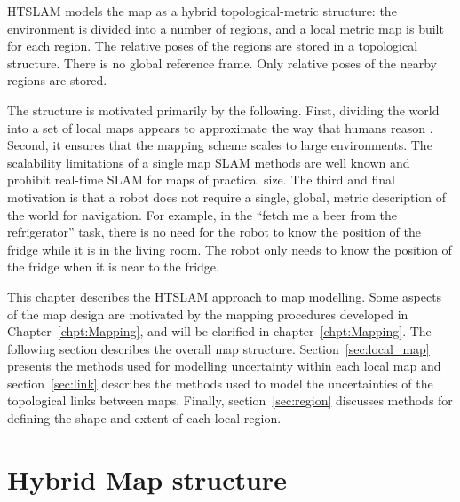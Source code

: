 HTSLAM models the map as a hybrid topological-metric structure: the
environment is divided into a number of regions, and a local metric
map is built for each region. The relative poses of the regions are
stored in a topological structure. There is no global reference
frame. Only relative poses of the nearby regions are stored.


The structure is motivated primarily by the following.  First,
dividing the world into a set of local maps appears to approximate the
way that humans reason \cite{psycho_kuipers82}. Second, it ensures
that the mapping scheme scales to large environments.  The scalability
limitations of a single map SLAM methods are well known
\cite{guivant04,guivant01,guivant02} and prohibit real-time SLAM for
maps of practical size.  The third and final motivation is that a
robot does not require a single, global, metric description of the
world for navigation. For example, in the ``fetch me a beer from the
refrigerator'' task, there is no need for the robot to know the
position of the fridge while it is in the living room.  The robot only
needs to know the position of the fridge when it is near to the
fridge.

This chapter describes the HTSLAM approach to map modelling.  Some
aspects of the map design are motivated by the mapping procedures
developed in Chapter~\ref{chpt:Mapping}, and will be clarified in
chapter~\ref{chpt:Mapping}. %
The following section describes the overall map structure.
Section~\ref{sec:local_map} presents the methods used for modelling
uncertainty within each local map and section~\ref{sec:link} describes
the methods used to model the uncertainties of the topological links
between maps.  Finally, section~\ref{sec:region} discusses methods for
defining the shape and extent of each local region.

\section{Hybrid Map structure}
\label{sec:HM_structure}

